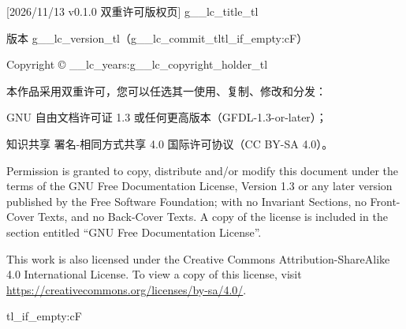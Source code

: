 [2026/11/13 v0.1.0 双重许可版权页]
\csname g__lc_title_tl\endcsname\par
版本 \csname g__lc_version_tl\endcsname（\csname g__lc_commit_tl\endcsname\csname tl_if_empty:cF）\par
Copyright © \csname __lc_years:\endcsname\space\csname g__lc_copyright_holder_tl\endcsname\par
\medskip
本作品采用双重许可，您可以任选其一使用、复制、修改和分发：\par
GNU 自由文档许可证 1.3 或任何更高版本（GFDL-1.3-or-later）；\par
知识共享 署名-相同方式共享 4.0 国际许可协议（CC BY-SA 4.0）。\par
\medskip
{\small
Permission is granted to copy, distribute and/or modify this document under the terms of the GNU Free Documentation License, Version 1.3 or any later version published by the Free Software Foundation; with no Invariant Sections, no Front-Cover Texts, and no Back-Cover Texts. A copy of the license is included in the section entitled “GNU Free Documentation License”.\par
\medskip
This work is also licensed under the Creative Commons Attribution-ShareAlike 4.0 International License. To view a copy of this license, visit \url{https://creativecommons.org/licenses/by-sa/4.0/}.\par}
\medskip
\csname tl_if_empty:cF
